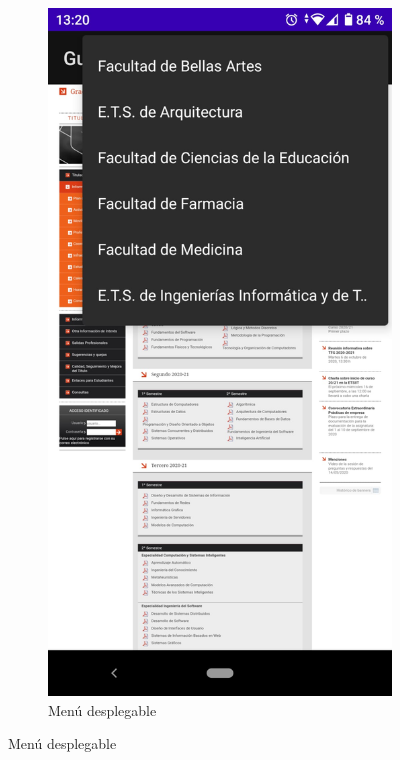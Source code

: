 \begin{figure}[H]
\begin{subfigure}{0.5\textwidth}
  \centering
  \includegraphics[width=1\linewidth]{imagenes/menu.jpeg}
  \caption{Menú desplegable}

\end{subfigure}
\end{figure}
